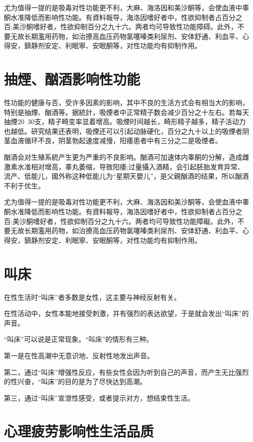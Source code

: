 \documentclass[12pt,UTF8]{ctexbook}
\begin{document}
尤为值得一提的是吸毒对性功能更不利，大麻、海洛因和美沙酮等，会使血液中睾酮水准降低而影响性功能。有資料報导，海洛因嗜好者中，性欲抑制者占百分之百;美沙酮嗜好者，性欲抑制百分之九十六。两者均可导致性功能障碍。此外，不要无故长期濫用药物，如治撩高血压药物氯噻嗪类利尿剂、安体舒通、利血平、心得安，鎮静剂安定、利眠寧、安眠酮等，对性功能均有抑制作用。

\section{抽煙、酗酒影响性功能}

性功能的健康与否，受许多因素的影响，其中不良的生活方式会有相当大的影响，特别是抽煙、酗酒等。据統計，吸煙者中正常精子数会减少百分之十左右。若每天抽煙20~30支，精子畸变率显着增高。吸煙时间越长，畸形精子越多，精子活动力也越低。研究结果还表明，吸煙还可以引起动脉硬化，百分之九十以上的吸煙者阴茎血液循环不良，阴茎勃起速度减慢，阳痿患者中有三分之二是吸煙者。

酗酒会对生殖系統产生更为严重的不良影响。酗酒可加速体内睾酮的分解，造成雌激素水准相对增高，睾丸萎缩，导致阳痿;过量攝入酒精，会引起胚胎发育异常、流产、低能儿，國外称这种低能儿为“星期天嬰儿”，是父親酗酒的结果，所以酗酒不利于优生。

尤为值得一提的是吸毒对性功能更不利，大麻、海洛因和美沙酮等，会使血液中睾酮水准降低而影响性功能。有資料報导，海洛因嗜好者中，性欲抑制者占百分之百;美沙酮嗜好者，性欲抑制百分之九十六。两者均可导致性功能障礙。此外，不要无故长期濫用药物，如治撩高血压药物氯噻嗪类利尿剂、安体舒通、利血平、心得安，鎮静剂安定、利眠寧、安眠酮等，对性功能均有抑制作用。

\section{叫床}

在性生活时“叫床”者多数是女性，这主要与神经反射有关。

在性活动中，女性本能地接受刺激，并有强烈的表达欲望，于是就会发出“叫床”的声音。

“叫床”可以说是正常现象。“叫床”的情形有三种。

第一是在性高潮中无意识地、反射性地发出声音。

第二，通过“叫床”增强性反应，有些女性会因为听到自己的声音，而产生无比强烈的性兴奋，“叫床”的目的是为了尽快达到高潮。

第三，通过“叫床”宣泄性感受，或者提示对方，想结束性生活。

\section{心理疲劳影响性生活品质}
\end{document}
